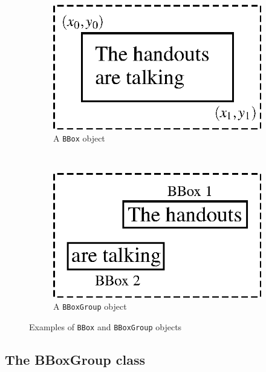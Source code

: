 \begin{figure}[ht]
    \centering
    \begin{subfigure}[t]{0.48\textwidth}
        \centering
        \includegraphics[width=\textwidth]{elem-bbox.eps}
        \caption{A \texttt{BBox} object}
        \label{fig:elem-bbox}
    \end{subfigure}%
    ~ 
    \begin{subfigure}[t]{0.48\textwidth}
        \centering
        \includegraphics[width=\textwidth]{elem-bboxgroup.eps}
        \caption{A \texttt{BBoxGroup} object}
        \label{fig:elem-bboxgroup}
    \end{subfigure}
    \caption{Examples of \texttt{BBox} and \texttt{BBoxGroup} objects}
\end{figure}

\subsection{The BBoxGroup class}

